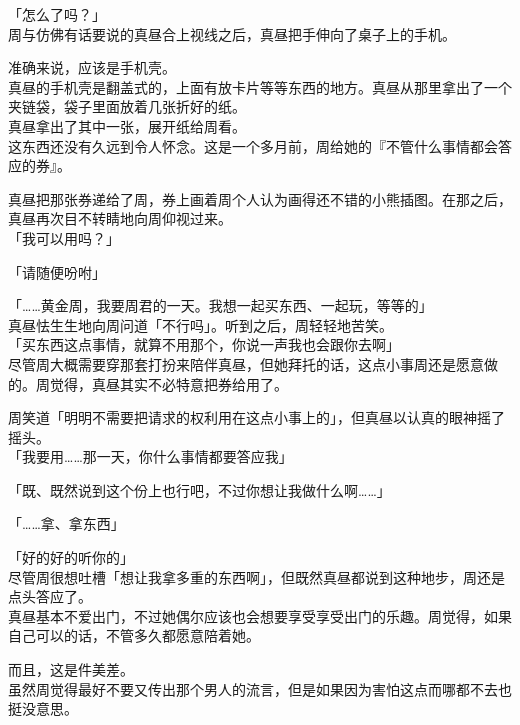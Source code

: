 「怎么了吗？」\\

周与仿佛有话要说的真昼合上视线之后，真昼把手伸向了桌子上的手机。

准确来说，应该是手机壳。\\

真昼的手机壳是翻盖式的，上面有放卡片等等东西的地方。真昼从那里拿出了一个夹链袋，袋子里面放着几张折好的纸。\\

真昼拿出了其中一张，展开纸给周看。\\

这东西还没有久远到令人怀念。这是一个多月前，周给她的『不管什么事情都会答应的券』。

真昼把那张券递给了周，券上画着周个人认为画得还不错的小熊插图。在那之后，真昼再次目不转睛地向周仰视过来。\\

「我可以用吗？」

「请随便吩咐」

「……黄金周，我要周君的一天。我想一起买东西、一起玩，等等的」\\

真昼怯生生地向周问道「不行吗」。听到之后，周轻轻地苦笑。\\

「买东西这点事情，就算不用那个，你说一声我也会跟你去啊」\\

尽管周大概需要穿那套打扮来陪伴真昼，但她拜托的话，这点小事周还是愿意做的。周觉得，真昼其实不必特意把券给用了。

周笑道「明明不需要把请求的权利用在这点小事上的」，但真昼以认真的眼神摇了摇头。\\

「我要用……那一天，你什么事情都要答应我」

「既、既然说到这个份上也行吧，不过你想让我做什么啊……」

「……拿、拿东西」

「好的好的听你的」\\

尽管周很想吐槽「想让我拿多重的东西啊」，但既然真昼都说到这种地步，周还是点头答应了。\\

真昼基本不爱出门，不过她偶尔应该也会想要享受享受出门的乐趣。周觉得，如果自己可以的话，不管多久都愿意陪着她。

而且，这是件美差。\\

虽然周觉得最好不要又传出那个男人的流言，但是如果因为害怕这点而哪都不去也挺没意思。\\


